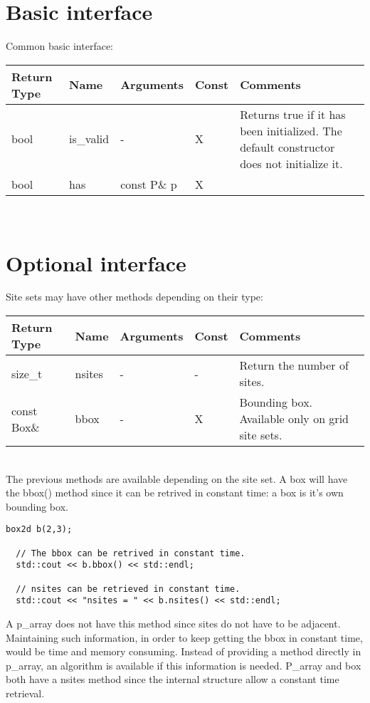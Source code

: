 \documentclass{report}
\begin{document}
\section{Basic interface}
Common basic interface:\\

\begin{tabular}{|l|l|l|l|p{4cm}|}
\hline
Return Type & Name & Arguments & Const & Comments \\ \hline

bool & is\_valid & - & X & Returns true if it has been initialized. The
default constructor does not initialize it. \\ \hline

bool & has & const P\& p & X &  \\ \hline
\end{tabular} \\


\section{Optional interface}
Site sets may have other methods depending on their type: \\

\begin{tabular}{|l|l|l|l|p{4cm}|}
\hline
Return Type & Name & Arguments & Const & Comments \\ \hline

size\_t & nsites & - & - & Return the number of sites. \\ \hline
const Box\& & bbox & - & X &  Bounding box. Available only on grid site sets.
\\ \hline
\end{tabular} \\

The previous methods are available depending on the site set. A box
will have the bbox() method since it can be retrived in constant time: a box
is it's own bounding box.

\begin{lstlisting}[frame=single]
  box2d b(2,3);

  // The bbox can be retrived in constant time.
  std::cout << b.bbox() << std::endl;

  // nsites can be retrieved in constant time.
  std::cout << "nsites = " << b.nsites() << std::endl;
\end{lstlisting}

A p\_array does not have this
method since sites do not have to be adjacent. Maintaining such information, in
order to keep getting the bbox in constant time, would be time and memory
consuming. Instead of providing a method directly in p\_array, an algorithm is
available if this information is needed.
P\_array and box both have a nsites method since the internal structure allow a
constant time retrieval.
\end{document}
